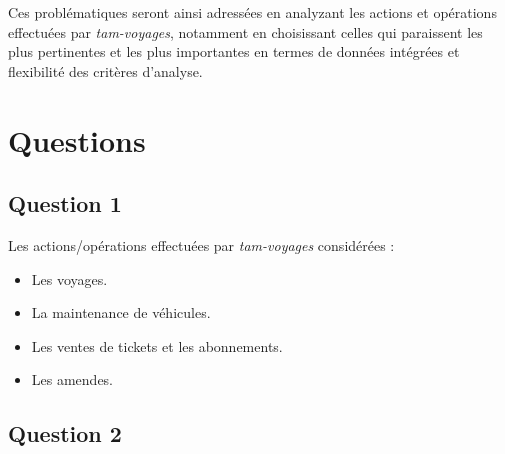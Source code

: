 \documentclass[a4paper,12pt]{report}
\begin{document}
Ces problématiques seront ainsi adressées en analyzant les actions et opérations effectuées par \textit{tam-voyages}, notamment en choisissant celles qui paraissent les plus pertinentes et les plus importantes en termes de données intégrées et flexibilité des critères d'analyse.

\chapter*{Questions}
\label{chap:questions}

\section*{Question 1}
\label{sec:question_1}

Les actions/opérations effectuées par \textit{tam-voyages} considérées :
\begin{itemize}
  \item Les voyages.
  \item La maintenance de véhicules.
  \item Les ventes de tickets et les abonnements.
  \item Les amendes.
\end{itemize}

\section*{Question 2}
\label{sec:question_2}
\end{document}
